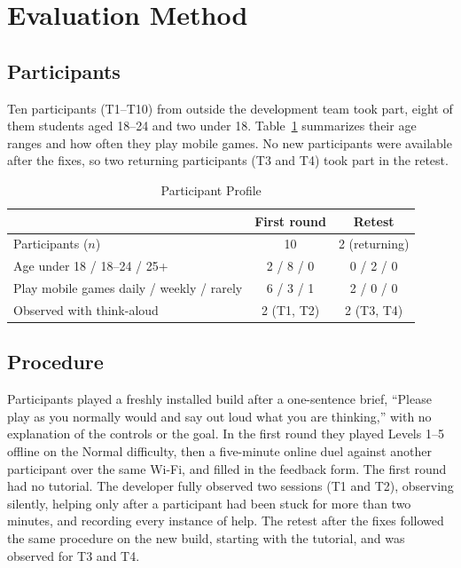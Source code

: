 \documentclass[conference]{IEEEtran}
\begin{document}
\section{Evaluation Method}
\subsection{Participants}
Ten participants (T1--T10) from outside the development team took part, eight of them students aged 18--24 and two under 18. Table~\ref{tab:participants} summarizes their age ranges and how often they play mobile games. No new participants were available after the fixes, so two returning participants (T3 and T4) took part in the retest.

\begin{table}[t]
\caption{Participant Profile}
\label{tab:participants}
\centering
\footnotesize
\begin{tabular}{@{}lcc@{}}
\toprule
 & First round & Retest \\
\midrule
Participants ($n$) & 10 & 2 (returning) \\
Age under 18 / 18--24 / 25+ & 2 / 8 / 0 & 0 / 2 / 0 \\
Play mobile games daily / weekly / rarely & 6 / 3 / 1 & 2 / 0 / 0 \\
Observed with think-aloud & 2 (T1, T2) & 2 (T3, T4) \\
\bottomrule
\end{tabular}
\end{table}

\subsection{Procedure}
Participants played a freshly installed build after a one-sentence brief, ``Please play as you normally would and say out loud what you are thinking,'' with no explanation of the controls or the goal. In the first round they played Levels 1--5 offline on the Normal difficulty, then a five-minute online duel against another participant over the same Wi-Fi, and filled in the feedback form. The first round had no tutorial. The developer fully observed two sessions (T1 and T2), observing silently, helping only after a participant had been stuck for more than two minutes, and recording every instance of help. The retest after the fixes followed the same procedure on the new build, starting with the tutorial, and was observed for T3 and T4.
\end{document}
